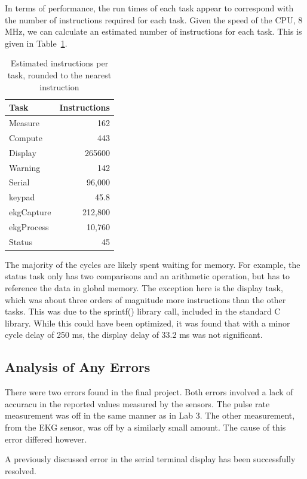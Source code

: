 \documentclass[12pt]{article} %
\begin{document}
    In terms of performance, the run times of each task appear to correspond with
    the number of instructions required for each task. Given the speed of the CPU,
    8 MHz, we can calculate an estimated number of instructions for each task.
    This is given in Table~\ref{tab:instr}.
    \begin{table}[h]
      \centering
      \begin{tabular}{|l|r|} 
	\hline
	Task & Instructions \\ \hline
	Measure & 162 \\ \hline
	Compute & 443 \\ \hline
	Display & 265600 \\ \hline
	Warning & 142 \\ \hline
    Serial & 96,000 \\ \hline
    keypad & 45.8 \\ \hline
    ekgCapture & 212,800 \\ \hline
    ekgProcess & 10,760 \\ \hline
	Status & 45 \\ \hline
      \end{tabular}
      \caption{Estimated instructions per task, rounded to the nearest instruction}
      \label{tab:instr}
    \end{table}
    The majority of the cycles are likely spent waiting for memory. For example,
    the status task only has two comparisons and an arithmetic operation, but has
    to reference the data in global memory. The exception here is the display
    task, which was about three orders of magnitude more instructions than the
    other tasks. This was due to the sprintf() library call, included in the
    standard C library. While this could have been optimized, it was found that
    with a minor cycle delay of 250 ms, the display delay of 33.2 ms was not
    significant.


    \subsection{Analysis of Any Errors}
    
		There were two errors found in the final project. Both errors involved a
		lack of accuracu in the reported values measured by the sensors. The pulse
		rate measurement was off in the same manner as in Lab 3. The other
		measurement, from the EKG sensor, was off by a similarly small amount. The
		cause of this error differed however.

		A previously discussed error in the serial terminal display has been
		successfully resolved.
\end{document}
